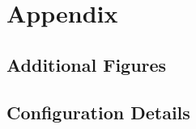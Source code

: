 \chapter{Appendix}
\label{chap:appendix}

\section{Additional Figures}

\section{Configuration Details}
